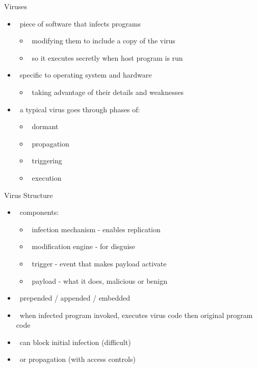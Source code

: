 \documentclass{beamer}
\begin{document}
\begin{frame}{Viruses }
  \begin{itemize}
  \item  piece of software that infects programs 
    \begin{itemize}
    \item  modifying them to include a copy of the virus 
    \item  so it executes secretly when host program is run 
    \end{itemize}
  \item  specific to operating system and hardware 
    \begin{itemize}
    \item  taking advantage of their details and weaknesses 
    \end{itemize}
  \item  a typical virus goes through phases of: 
    \begin{itemize}
    \item  dormant 
    \item  propagation 
    \item  triggering 
    \item  execution
    \end{itemize}
  \end{itemize}
\end{frame}

\begin{frame}{Virus Structure }
  \begin{itemize}
  \item  components: 
    \begin{itemize}
    \item  infection mechanism - enables replication 
    \item  modification engine - for disguise 
    \item  trigger - event that makes payload activate 
    \item  payload - what it does, malicious or benign 
    \end{itemize}
  \item  prepended / appended / embedded 
  \item  when infected program invoked, executes 
    virus code then original program code 
  \item  can block initial infection (difficult)‏ 
  \item  or propagation (with access controls)
  \end{itemize}
\end{frame}
\end{document}
